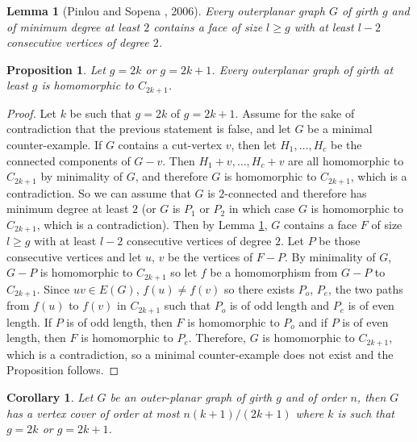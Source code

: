 \documentclass{article}
\newtheorem{corollary}[theorem]{Corollary}
\newtheorem{lemma}[theorem]{Lemma}
\newtheorem{proposition}[theorem]{Proposition}
\begin{document}
\begin{lemma}[Pinlou and Sopena \cite{pinlou2006oriented}, 2006]\label{lemma:pinlou2006oriented}
    Every outerplanar graph $G$ of girth $g$ and of minimum degree at least $2$ contains a face of size $l \ge g$ with at least $l - 2$ consecutive vertices of degree $2$.
\end{lemma}

\begin{proposition}\label{prop:homomorphism}
    Let $g = 2k$ or $g = 2k + 1$. Every outerplanar graph of girth at least $g$ is homomorphic to $C_{2k + 1}$.
\end{proposition}

\begin{proof}
    Let $k$ be such that $g = 2k$ of $g = 2k + 1$. Assume for the sake of contradiction that the previous statement is false, and let $G$ be a minimal counter-example. If $G$ contains a cut-vertex $v$, then let $H_1, \dots, H_c$ be the connected components of $G - v$. Then $H_1 + v, \dots, H_c + v$ are all homomorphic to $C_{2k + 1}$ by minimality of $G$, and therefore $G$ is homomorphic to $C_{2k + 1}$, which is a contradiction. So we can assume that $G$ is $2$-connected and therefore has minimum degree at least $2$ (or $G$ is $P_1$ or $P_2$ in which case $G$ is homomorphic to $C_{2k + 1}$, which is a contradiction). Then by Lemma \ref{lemma:pinlou2006oriented}, $G$ contains a face $F$ of size $l \ge g$ with at least $l - 2$ consecutive vertices of degree $2$. Let $P$ be those consecutive vertices and let $u$, $v$ be the vertices of $F - P$. By minimality of $G$, $G - P$ is homomorphic to $C_{2k + 1}$ so let $f$ be a homomorphism from $G - P$ to $C_{2k + 1}$. Since $uv \in E(G)$, $f(u) \neq f(v)$ so there exists $P_o$, $P_e$, the two paths from $f(u)$ to $f(v)$ in $C_{2k + 1}$ such that $P_o$ is of odd length and $P_e$ is of even length. If $P$ is of odd length, then $F$ is homomorphic to $P_o$ and if $P$ is of even length, then $F$ is homomorphic to $P_e$. Therefore, $G$ is homomorphic to $C_{2k + 1}$, which is a contradiction, so a minimal counter-example does not exist and the Proposition follows.
\end{proof}

\begin{corollary}\label{coro:vertex_cover_coro}
    Let $G$ be an outer-planar graph of girth $g$ and of order $n$, then $G$ has a vertex cover of order at most $n(k + 1)/(2k + 1)$ where $k$ is such that $g = 2k$ or $g = 2k + 1$.
\end{corollary}
\end{document}
